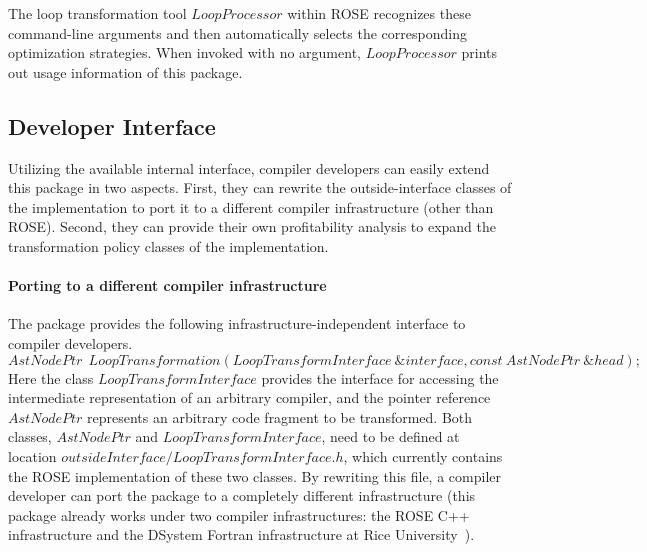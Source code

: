 The loop transformation tool $LoopProcessor$ within ROSE recognizes 
these command-line arguments and then automatically selects the corresponding
optimization strategies.
When invoked with no argument, $LoopProcessor$ prints out 
usage information of this package.

\subsection{Developer Interface}
\label {sec-interface-developer}

Utilizing the available internal interface,
compiler developers can easily extend this package in two aspects. First,
they can rewrite the outside-interface classes of the implementation
to port it to a different compiler infrastructure (other than ROSE).
Second, they can provide their own profitability analysis  
to expand the transformation policy classes of the implementation.

\paragraph {Porting to a different compiler infrastructure} 
The package provides the following infrastructure-independent
interface to compiler developers.
\begin {equation}
AstNodePtr \ \ LoopTransformation( LoopTransformInterface\  \&interface, const \ AstNodePtr\ \&head);
\end {equation}
Here the class $LoopTransformInterface$  provides the interface for
accessing the intermediate representation of an arbitrary compiler,
and the pointer reference $AstNodePtr$ represents an arbitrary code fragment
to be transformed. Both classes, $AstNodePtr$ and $LoopTransformInterface$, 
need to be defined at location $outsideInterface/LoopTransformInterface.h$, 
which currently contains the ROSE implementation of these two classes.
By rewriting this file, a compiler developer can port the package
to a completely different infrastructure (this package already works under 
two compiler infrastructures: the ROSE C++ infrastructure and the DSystem Fortran infrastructure 
at Rice University~\cite{AM:PLDI98}).

